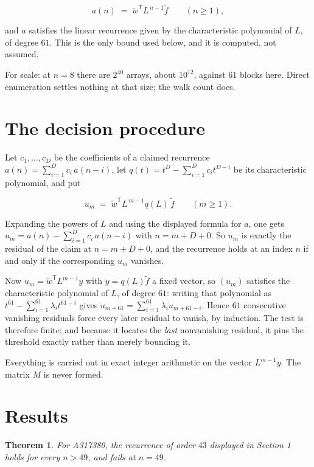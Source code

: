 \documentclass[11pt]{article}
\newtheorem{theorem}{Theorem}
\theoremstyle{definition}
\begin{document}
\[a(n) \;=\; \tilde w^{\mathsf T} L^{\,n-1} \tilde f \qquad (n \ge 1),\]

and $a$ satisfies the linear recurrence given by the characteristic polynomial of $L$, of degree $61$. This is the only bound used below, and it is computed, not assumed.

For scale: at $n = 8$ there are $2^{40}$ arrays, about $10^{12}$, against $61$ blocks here. Direct enumeration settles nothing at that size; the walk count does.

\section{The decision procedure}

Let $c_1,\dots,c_D$ be the coefficients of a claimed recurrence $a(n) = \sum_{i=1}^{D} c_i\,a(n-i)$, let $q(t) = t^{D} - \sum_{i=1}^{D} c_i t^{D-i}$ be its characteristic polynomial, and put

\[u_m \;=\; \tilde w^{\mathsf T} L^{\,m-1} q(L)\,\tilde f \qquad (m \ge 1).\]

Expanding the powers of $L$ and using the displayed formula for $a$, one gets $u_m = a(n) - \sum_{i=1}^{D} c_i\,a(n-i)$ with $n = m + D + 0$. So $u_m$ is exactly the residual of the claim at $n = m + D + 0$, and the recurrence holds at an index $n$ if and only if the corresponding $u_m$ vanishes.

Now $u_m = \tilde w^{\mathsf T} L^{m-1} y$ with $y = q(L)\tilde f$ a fixed vector, so $(u_m)$ satisfies the characteristic polynomial of $L$, of degree $61$: writing that polynomial as $t^{61} - \sum_{i=1}^{61} \lambda_i t^{61-i}$ gives $u_{m+61} = \sum_{i=1}^{61} \lambda_i u_{m+61-i}$. Hence $61$ consecutive vanishing residuals force every later residual to vanish, by induction. The test is therefore finite; and because it locates the {\itshape last} nonvanishing residual, it pins the threshold exactly rather than merely bounding it.

Everything is carried out in exact integer arithmetic on the vector $L^{m-1}y$. The matrix $M$ is never formed.

\section{Results}

\begin{theorem} For A317380, the recurrence of order $43$ displayed in Section 1 holds for every $n > 49$, and fails at $n = 49$.\end{theorem}
\end{document}
